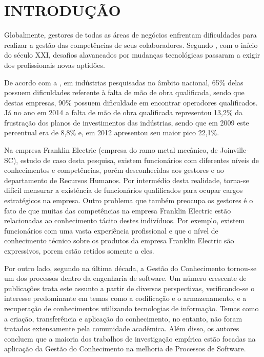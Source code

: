 \chapter{INTRODUÇÃO}
\label{chp:intro}

Globalmente, gestores de todas as áreas de negócios enfrentam dificuldades para realizar a gestão das competências de seus colaboradores. Segundo , com o início do século XXI, desafios alavancados por mudanças tecnológicas passaram a exigir dos profissionais novas aptidões.

De acordo com a , em indústrias pesquisadas no âmbito nacional, 65\% delas possuem dificuldades referente à falta de mão de obra qualificada, sendo que destas empresas, 90\% possuem dificuldade em encontrar operadores qualificados. Já no ano em 2014 a falta de mão de obra qualificada representou 13,2\% da frustração dos planos de investimentos das indústrias, sendo que em 2009 este percentual era de 8,8\% e, em 2012 apresentou seu maior pico 22,1\%.

Na empresa Franklin Electric (empresa do ramo metal mecânico, de Joinville-SC), estudo de caso desta pesquisa, existem funcionários com diferentes níveis de conhecimentos e competências, porém desconhecidas aos gestores e ao departamento de Recursos Humanos. Por intermédio desta realidade, torna-se difícil mensurar a existência de funcionários qualificados para ocupar cargos estratégicos na empresa. Outro problema que também preocupa os gestores é o fato de que muitas das competências na empresa Franklin Electric estão relacionadas ao conhecimento tácito destes indivíduos. Por exemplo, existem funcionários com uma vasta experiência profissional e que o nível de conhecimento técnico sobre os produtos da empresa Franklin Electric são expressivos, porem estão retidos somente a eles.

Por outro lado, segundo  na última década, a Gestão do Conhecimento tornou-se um dos processos dentro da engenharia de software. Um número crescente de publicações trata este assunto a partir de diversas perspectivas, verificando-se o interesse predominante em temas como a codificação e o armazenamento, e a recuperação de conhecimentos utilizando tecnologias de informação. Temas como a criação, transferência e aplicação do conhecimento, no entanto, não foram tratados extensamente pela comunidade acadêmica. Além disso, os autores concluem que a maioria dos trabalhos de investigação empírica estão focadas na aplicação da Gestão do Conhecimento na melhoria de Processos de Software.

